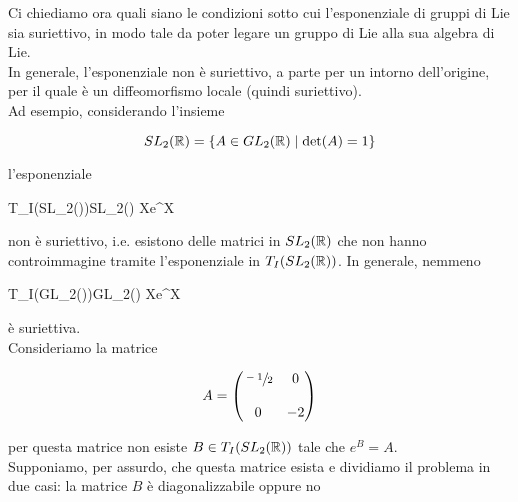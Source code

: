 Ci chiediamo ora quali siano le condizioni sotto cui l'esponenziale di gruppi di Lie sia suriettivo, in modo tale da poter legare un gruppo di Lie alla sua algebra di Lie.\\
In generale, l'esponenziale non è suriettivo, a parte per un intorno dell'origine, per il quale è un diffeomorfismo locale (quindi suriettivo).\\
Ad esempio, considerando l'insieme

\begin{equation}
	SL_{2}(\mathbb{R}) = \{ A \in GL_{2}(\mathbb{R}) \mid \det(A) = 1 \}
\end{equation}

l'esponenziale

\map{\exp}%
	{T_{I}(SL_{2}(\R))}{SL_{2}(\R)}%
	{X}{e^{X}}

non è suriettivo, i.e. esistono delle matrici in $ SL_{2}(\mathbb{R}) $ che non hanno controimmagine tramite l'esponenziale in $ T_{I}(SL_{2}(\mathbb{R})) $. In generale, nemmeno

\map{\exp}%
	{T_{I}(GL_{2}(\R))}{GL_{2}(\R)}%
	{X}{e^{X}}

è suriettiva.\\
Consideriamo la matrice

\begin{equation}
	A = \mqty( \sfrac{-1}{2} & 0 \\\\ 0 & -2 )
\end{equation}

per questa matrice non esiste $ B \in T_{I}(SL_{2}(\mathbb{R})) $ tale che $ e^{B} = A $.\\
Supponiamo, per assurdo, che questa matrice esista e dividiamo il problema in due casi: la matrice $ B $ è diagonalizzabile oppure no

